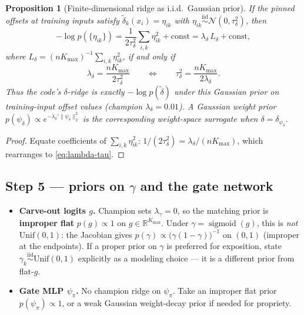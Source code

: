 \documentclass[11pt,a4paper]{article}
\theoremstyle{plain}
\newtheorem{proposition}[theorem]{Proposition}
\theoremstyle{definition}
\theoremstyle{remark}
\newcommand{\R}{\mathbb{R}}
\newcommand{\Ncal}{\mathcal{N}}
\newcommand{\sigmoid}{\operatorname{sigmoid}}
\newcommand{\Kmax}{K_{\max}}
\begin{document}
\begin{proposition}[Finite-dimensional ridge as i.i.d.\ Gaussian prior]
\label{prop:delta-ridge}
If the pinned offsets at training inputs satisfy
\(\tilde\delta_k(x_i)=\eta_{ik}\) with
\(\eta_{ik}\stackrel{\mathrm{iid}}{\sim}\Ncal(0,\tau_\delta^2)\), then
\[
  -\log p(\{\eta_{ik}\})
  =
  \frac{1}{2\tau_\delta^2}\sum_{i,k}\eta_{ik}^{2}
  +
  \mathrm{const}
  =
  \lambda_\delta\,L_\delta
  +
  \mathrm{const},
\]
where \(L_\delta=(n\Kmax)^{-1}\sum_{i,k}\eta_{ik}^{2}\), if and only if
\begin{equation}
  \lambda_\delta
  =
  \frac{n\Kmax}{2\tau_\delta^2}
  \qquad\Leftrightarrow\qquad
  \tau_\delta^2
  =
  \frac{n\Kmax}{2\lambda_\delta}.
  \label{eq:lambda-tau}
\end{equation}
Thus the code's \(\delta\)-ridge is exactly \(-\log p(\tilde\delta)\) under this
Gaussian prior on training-input offset values (champion \(\lambda_\delta=0.01\)).
A Gaussian weight prior \(p(\psi_\delta)\propto e^{-\lambda_\delta'\|\psi_\delta\|_2^2}\)
is the corresponding weight-space surrogate when \(\delta=\delta_{\psi_\delta}\).
\end{proposition}

\begin{proof}
Equate coefficients of \(\sum_{i,k}\eta_{ik}^{2}\):
\(1/(2\tau_\delta^2)=\lambda_\delta/(n\Kmax)\), which rearranges to
\eqref{eq:lambda-tau}.
\end{proof}

\subsection{Step 5 --- priors on \(\gamma\) and the gate network}
\begin{itemize}[leftmargin=1.2em]
  \item \textbf{Carve-out logits \(g\).}
Champion sets \(\lambda_\gamma=0\), so the matching
        prior is \textbf{improper flat} \(p(g)\propto 1\) on \(g\in\R^{\Kmax}\).
        Under \(\gamma=\sigmoid(g)\), this is \emph{not} \(\mathrm{Unif}(0,1)\): the
        Jacobian gives \(p(\gamma)\propto \bigl(\gamma(1-\gamma)\bigr)^{-1}\) on
        \((0,1)\) (improper at the endpoints). If a proper prior on \(\gamma\) is
        preferred for exposition, state \(\gamma_k\stackrel{\mathrm{iid}}{\sim}\mathrm{Unif}(0,1)\)
        explicitly as a modeling choice --- it is a different prior from flat-\(g\).
  \item \textbf{Gate MLP \(\psi_\pi\).}
No champion ridge on \(\psi_\pi\). Take an improper flat prior
        \(p(\psi_\pi)\propto 1\), or a weak Gaussian weight-decay prior if needed for
        propriety.
\end{itemize}
\end{document}
